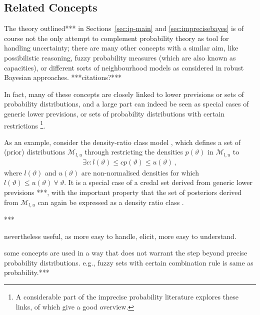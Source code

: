 \subsection{Related Concepts}

The theory outlined*** in Sections~\ref{sec:ip-main} and \ref{sec:imprecisebayes}
is of course not the only attempt to complement probability theory as tool for handling uncertainty;
there are many other concepts with a similar aim,
like possibilistic reasoning, fuzzy probability measures (which are also known as capacities),
or different sorts of neighbourhood models as considered in robust Bayesian approaches. ***citations?*** %

In fact, many of these concepts are closely linked to
lower previsions or sets of probability distributions,
and a large part can indeed be seen as special cases of generic lower previsions, 
or sets of probability distributions with certain restrictions%
\footnote{A considerable part of the imprecise probability literature
explores these links, of which \textcite{itip-special,itip-other}
give a good overview.}. %

As an example, consider the density-ratio class model
\parencites{1981:derobertis}{1990:berger}, which defines
a set of (prior) distributions $\mathcal{M}_{l,u}$ through restricting
the densities $p(\vartheta)$ in $\mathcal{M}_{l,u}$ to
\begin{align*}
\exists c: l(\vartheta) \le c p(\vartheta) \le u(\vartheta)\,,
\end{align*}
where $l(\vartheta)$ and $u(\vartheta)$ are non-normalised densities
for which $l(\vartheta) \le u(\vartheta)\ \forall\ \vartheta$.
It is a special case of a credal set derived from generic lower previsions
\parencite[Figure~5.5]{itip-special}***,
with the important property that the set of posteriors derived from $\mathcal{M}_{l,u}$
can again be expressed as a density ratio class \parencite{1981:derobertis}.


***\cite{2011:rinderknecht}






nevertheless useful, as more easy to handle, elicit,
more easy to understand.

some concepts are used in a way that does not warrant
the step beyond precise probability distributions.
e.g., fuzzy sets with certain combination rule is same as probability.***

